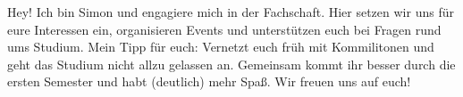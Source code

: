 \begin{multicols}{2}
{
Hey! Ich bin Simon und engagiere mich in der Fachschaft. Hier setzen wir uns für eure Interessen ein, organisieren Events und unterstützen euch bei Fragen rund ums Studium. Mein Tipp für euch: Vernetzt euch früh mit Kommilitonen und geht das Studium nicht allzu gelassen an. Gemeinsam kommt ihr besser durch die ersten Semester und habt (deutlich) mehr Spaß. Wir freuen uns auf euch! 
}


\end{multicols}
